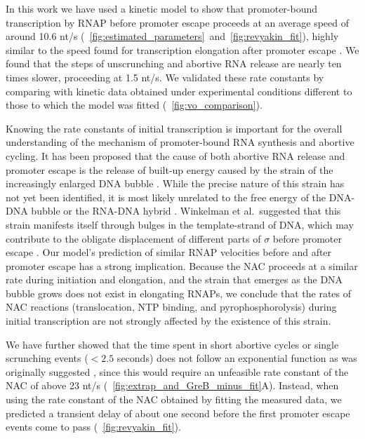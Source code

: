 %

In this work we have used a kinetic model to show that promoter-bound
transcription by RNAP before promoter escape proceeds at an average speed of
around 10.6 nt/s
(\FIGS~\ref{fig:estimated_parameters}~and~\ref{fig:revyakin_fit}), highly
similar to the speed found for transcription elongation after promoter escape
\cite{revyakin_abortive_2006}. We found that the steps of unscrunching and
abortive RNA release are nearly ten times slower, proceeding at 1.5 nt/s.  We
validated these rate constants by comparing with kinetic data obtained under
experimental conditions different to those to which the model was fitted
(\FIG~\ref{fig:vo_comparison}).

Knowing the rate constants of initial transcription is important for the
overall understanding of the mechanism of promoter-bound RNA synthesis and
abortive cycling. It has been proposed that the cause of both abortive RNA
release and promoter escape is the release of built-up energy caused by the
strain of the increasingly enlarged DNA bubble \cite{straney_stressed_1987,
hsu_promoter_2002, revyakin_abortive_2006}. While the precise nature of this
strain has not yet been identified, it is most likely unrelated to the free
energy of the DNA-DNA bubble or the RNA-DNA hybrid \cite{hsu_initial_2006,
skancke_sequence-dependent_2015}. Winkelman et al.\ suggested that this strain
manifests itself through bulges in the template-strand of DNA, which may
contribute to the obligate displacement of different parts of $\sigma$ before
promoter escape \cite{winkelman_crosslink_2015}. Our model's prediction of
similar RNAP velocities before and after promoter escape has a strong
implication. Because the NAC proceeds at a similar rate during initiation and
elongation, and the strain that emerges as the DNA bubble grows does not exist
in elongating RNAPs, we conclude that the rates of NAC reactions
(translocation, NTP binding, and pyrophosphorolysis) during initial
transcription are not strongly affected by the existence of this strain.

We have further showed that the time spent in short abortive cycles or single
scrunching events ($< 2.5$ seconds) does not follow an exponential function
as was originally suggested \cite{revyakin_abortive_2006}, since this would
require an unfeasible rate constant of the NAC of above 23 nt/s
(\FIG~\ref{fig:extrap_and_GreB_minus_fit}A). Instead, when using the rate
constant of the NAC obtained by fitting the measured data, we predicted a
transient delay of about one second before the first promoter escape events
come to pass (\FIG~\ref{fig:revyakin_fit}).

